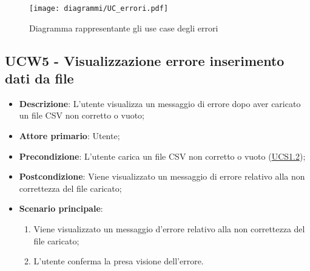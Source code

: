 \begin{figure}[h]
    \centering
    \texttt{[image: diagrammi/UC\_errori.pdf]}
    \caption{Diagramma rappresentante gli use case degli errori}
    \label{fig:UC5}
\end{figure}

\subsection{UCW5 - Visualizzazione errore inserimento dati da file}
\label{sub:ucw5}
\begin{itemize}
    \item \textbf{Descrizione}: L'utente visualizza un messaggio di errore dopo aver caricato un file CSV non corretto 
    o vuoto;

    \item \textbf{Attore primario}: Utente;
    
    \item \textbf{Precondizione}:   L'utente carica un file CSV non corretto o vuoto (\hyperref[ssub:ucs1.2]{UCS1.2});

    \item \textbf{Postcondizione}:  Viene visualizzato un messaggio di errore relativo alla non correttezza del file 
    caricato;

    \item \textbf{Scenario principale}:
    \begin{enumerate}
        \item Viene visualizzato un messaggio d'errore relativo alla non correttezza del file caricato;
        \item L'utente conferma la presa visione dell'errore.
    \end{enumerate}

\end{itemize}